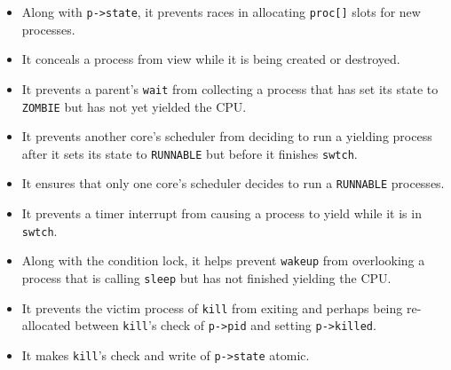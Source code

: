 
\begin{itemize}

\item Along with \lstinline{p->state}, it prevents races in allocating
  \lstinline{proc[]} slots for new processes.

\item It conceals a process from view while it is being created
or destroyed.

\item It prevents a parent's \lstinline{wait} from collecting a
process that has set its state to \lstinline{ZOMBIE} but has
not yet yielded the CPU.

\item It prevents another core's scheduler from deciding to run
a yielding process after it sets its state to \lstinline{RUNNABLE} but
before it finishes \lstinline{swtch}.

\item It ensures that only one core's scheduler decides to run a
  \lstinline{RUNNABLE} processes.

\item It prevents a timer interrupt from causing a process to
yield while it is in \lstinline{swtch}.

\item Along with the condition lock, it helps prevent \lstinline{wakeup}
from overlooking a process that is calling \lstinline{sleep} but has not
finished yielding the CPU.

\item It prevents the victim process of \lstinline{kill} from exiting
and perhaps being re-allocated between \lstinline{kill}'s check of 
\lstinline{p->pid} and setting \lstinline{p->killed}.

\item It makes \lstinline{kill}'s check and write of \lstinline{p->state}
atomic.

\end{itemize}


